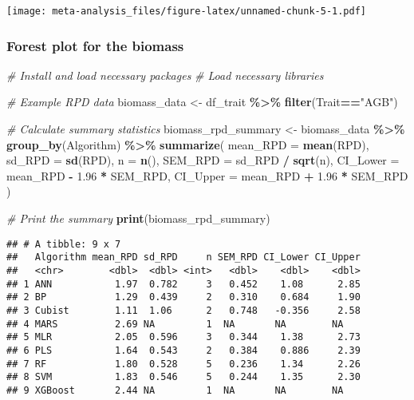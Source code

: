 \documentclass[
]{article}
\newenvironment{Shaded}{\begin{snugshade}}{\end{snugshade}}
\newcommand{\AttributeTok}[1]{\textcolor[rgb]{0.13,0.29,0.53}{#1}}
\newcommand{\CommentTok}[1]{\textcolor[rgb]{0.56,0.35,0.01}{\textit{#1}}}
\newcommand{\FloatTok}[1]{\textcolor[rgb]{0.00,0.00,0.81}{#1}}
\newcommand{\FunctionTok}[1]{\textcolor[rgb]{0.13,0.29,0.53}{\textbf{#1}}}
\newcommand{\NormalTok}[1]{#1}
\newcommand{\OtherTok}[1]{\textcolor[rgb]{0.56,0.35,0.01}{#1}}
\newcommand{\SpecialCharTok}[1]{\textcolor[rgb]{0.81,0.36,0.00}{\textbf{#1}}}
\newcommand{\StringTok}[1]{\textcolor[rgb]{0.31,0.60,0.02}{#1}}
\begin{document}
\texttt{[image: meta-analysis\_files/figure-latex/unnamed-chunk-5-1.pdf]}

\hypertarget{forest-plot-for-the-biomass}{%
\subsubsection{Forest plot for the
biomass}\label{forest-plot-for-the-biomass}}

\begin{Shaded}
\begin{Highlighting}[]
\CommentTok{\# Install and load necessary packages}
\CommentTok{\# Load necessary libraries}

\CommentTok{\# Example RPD data}
\NormalTok{biomass\_data }\OtherTok{\textless{}{-}}\NormalTok{ df\_trait }\SpecialCharTok{\%\textgreater{}\%} \FunctionTok{filter}\NormalTok{(Trait}\SpecialCharTok{==}\StringTok{"AGB"}\NormalTok{)}

\CommentTok{\# Calculate summary statistics}
\NormalTok{biomass\_rpd\_summary }\OtherTok{\textless{}{-}}\NormalTok{ biomass\_data }\SpecialCharTok{\%\textgreater{}\%}
  \FunctionTok{group\_by}\NormalTok{(Algorithm) }\SpecialCharTok{\%\textgreater{}\%}
  \FunctionTok{summarize}\NormalTok{(}
    \AttributeTok{mean\_RPD =} \FunctionTok{mean}\NormalTok{(RPD),}
    \AttributeTok{sd\_RPD =} \FunctionTok{sd}\NormalTok{(RPD),}
    \AttributeTok{n =} \FunctionTok{n}\NormalTok{(),}
    \AttributeTok{SEM\_RPD =}\NormalTok{ sd\_RPD }\SpecialCharTok{/} \FunctionTok{sqrt}\NormalTok{(n),}
    \AttributeTok{CI\_Lower =}\NormalTok{ mean\_RPD }\SpecialCharTok{{-}} \FloatTok{1.96} \SpecialCharTok{*}\NormalTok{ SEM\_RPD,}
    \AttributeTok{CI\_Upper =}\NormalTok{ mean\_RPD }\SpecialCharTok{+} \FloatTok{1.96} \SpecialCharTok{*}\NormalTok{ SEM\_RPD}
\NormalTok{  )}

\CommentTok{\# Print the summary}
\FunctionTok{print}\NormalTok{(biomass\_rpd\_summary)}
\end{Highlighting}
\end{Shaded}

\begin{verbatim}
## # A tibble: 9 x 7
##   Algorithm mean_RPD sd_RPD     n SEM_RPD CI_Lower CI_Upper
##   <chr>        <dbl>  <dbl> <int>   <dbl>    <dbl>    <dbl>
## 1 ANN           1.97  0.782     3   0.452    1.08      2.85
## 2 BP            1.29  0.439     2   0.310    0.684     1.90
## 3 Cubist        1.11  1.06      2   0.748   -0.356     2.58
## 4 MARS          2.69 NA         1  NA       NA        NA   
## 5 MLR           2.05  0.596     3   0.344    1.38      2.73
## 6 PLS           1.64  0.543     2   0.384    0.886     2.39
## 7 RF            1.80  0.528     5   0.236    1.34      2.26
## 8 SVM           1.83  0.546     5   0.244    1.35      2.30
## 9 XGBoost       2.44 NA         1  NA       NA        NA
\end{verbatim}
\end{document}
